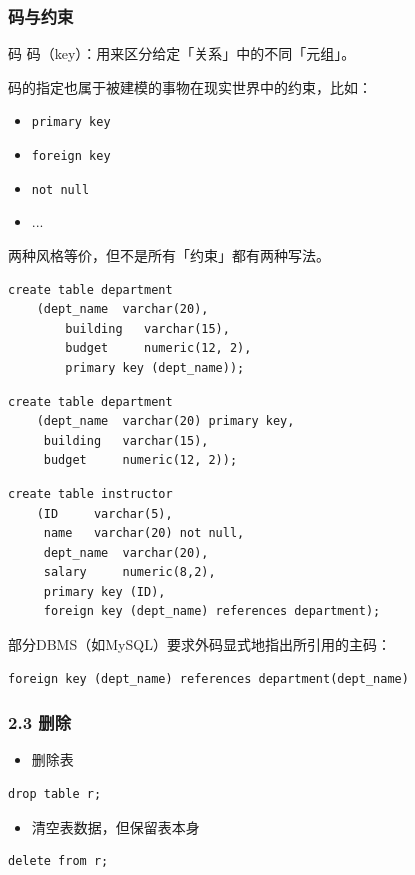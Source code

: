\documentclass[aspectratio=169, 14pt]{beamer}
\begin{document}
\begin{frame}
	\frametitle{码与约束}
	\begin{block}{码}
		码（key）：用来区分给定「关系」中的不同「元组」。
	\end{block}
	码的指定也属于被建模的事物在现实世界中的\alert{约束}，比如：

	\begin{itemize}
		\item \texttt{primary key}
		\item \texttt{foreign key}
		\item \texttt{not null}
		\item ...
	\end{itemize}

\end{frame}

\begin{frame}[fragile]
	两种风格等价，但不是所有「约束」都有两种写法。

	\begin{verbatim}
create table department
    (dept_name  varchar(20),
        building   varchar(15),
        budget     numeric(12, 2),
        primary key (dept_name)); 
    \end{verbatim}

	\begin{verbatim}
create table department
    (dept_name  varchar(20) primary key,
     building   varchar(15),
     budget     numeric(12, 2)); 
        \end{verbatim}

\end{frame}

\begin{frame}[fragile]
	\begin{verbatim}
create table instructor
    (ID     varchar(5), 
     name   varchar(20) not null, 
     dept_name  varchar(20),
     salary     numeric(8,2),
     primary key (ID),
     foreign key (dept_name) references department);
    \end{verbatim}
	\pause
	部分DBMS（如MySQL）要求外码显式地指出所引用的主码：
	\begin{verbatim}
foreign key (dept_name) references department(dept_name)
\end{verbatim}
\end{frame}

\begin{frame}[fragile]
	\frametitle{2.3 删除}
	\begin{itemize}
		\item 删除表
	\end{itemize}
	\begin{verbatim}
drop table r;
\end{verbatim}

	\begin{itemize}
		\item 清空表数据，但保留表本身
	\end{itemize}
	\begin{verbatim}
delete from r;
\end{verbatim}
\end{frame}
\end{document}

